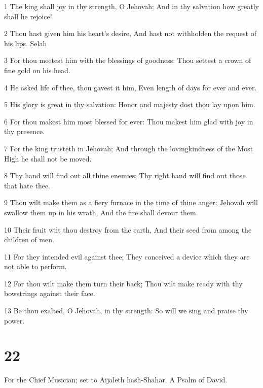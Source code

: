 \par 1 The king shall joy in thy strength, O Jehovah; And in thy salvation how greatly shall he rejoice!
\par 2 Thou hast given him his heart's desire, And hast not withholden the request of his lips. Selah
\par 3 For thou meetest him with the blessings of goodness: Thou settest a crown of fine gold on his head.
\par 4 He asked life of thee, thou gavest it him, Even length of days for ever and ever.
\par 5 His glory is great in thy salvation: Honor and majesty dost thou lay upon him.
\par 6 For thou makest him most blessed for ever: Thou makest him glad with joy in thy presence.
\par 7 For the king trusteth in Jehovah; And through the lovingkindness of the Most High he shall not be moved.
\par 8 Thy hand will find out all thine enemies; Thy right hand will find out those that hate thee.
\par 9 Thou wilt make them as a fiery furnace in the time of thine anger: Jehovah will swallow them up in his wrath, And the fire shall devour them.
\par 10 Their fruit wilt thou destroy from the earth, And their seed from among the children of men.
\par 11 For they intended evil against thee; They conceived a device which they are not able to perform.
\par 12 For thou wilt make them turn their back; Thou wilt make ready with thy bowstrings against their face.
\par 13 Be thou exalted, O Jehovah, in thy strength: So will we sing and praise thy power.

\chapter{22}

\par For the Chief Musician; set to Aijaleth hash-Shahar. A Psalm of David.

